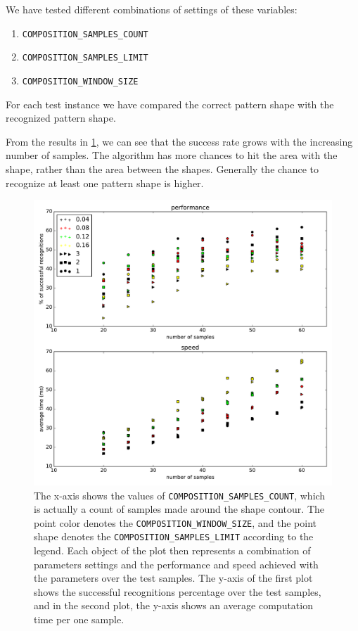 We have tested different combinations of settings of these variables:
\begin{enumerate}
\item \texttt{COMPOSITION\_SAMPLES\_COUNT}
\item \texttt{COMPOSITION\_SAMPLES\_LIMIT}
\item \texttt{COMPOSITION\_WINDOW\_SIZE} 
\end{enumerate}

For each test instance we have compared the correct pattern shape with the recognized pattern shape.

From the results in \cref{fig:com}, we can see that the success rate grows with the increasing number of samples. The algorithm has more chances to hit the area with the shape, rather than the area between the shapes. Generally the chance to recognize at least one pattern shape is higher.

\begin{figure}
\centering
\includegraphics[width=.8\linewidth]{ext/figure_composition_results.pdf}
\caption{The x-axis shows the values of \texttt{COMPOSITION\_SAMPLES\_COUNT}, which is actually a count of samples made around the shape contour. The point color denotes the \texttt{COMPOSITION\_WINDOW\_SIZE}, and the point shape denotes the \texttt{COMPOSITION\_SAMPLES\_LIMIT} according to the legend. Each object of the plot then represents a combination of parameters settings and the performance and speed achieved with the parameters over the test samples. The y-axis of the first plot shows the successful recognitions percentage over the test samples, and in the second plot, the y-axis shows an average computation time per one sample.}
\label{fig:com}
\end{figure}

